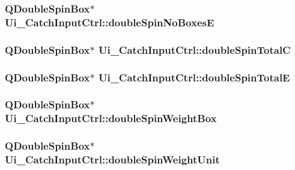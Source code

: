 \hypertarget{class_ui___catch_input_ctrl_aa9fa8f4049a06445c3abbc8291ffe0b3}{
\subsubsection[{doubleSpinNoBoxesE}]{\setlength{\rightskip}{0pt plus 5cm}QDoubleSpinBox$\ast$ {\bf Ui\_\-CatchInputCtrl::doubleSpinNoBoxesE}}}
\label{class_ui___catch_input_ctrl_aa9fa8f4049a06445c3abbc8291ffe0b3}
\hypertarget{class_ui___catch_input_ctrl_aff17e56983eb8a28a43bee32c447cbc9}{
\subsubsection[{doubleSpinTotalC}]{\setlength{\rightskip}{0pt plus 5cm}QDoubleSpinBox$\ast$ {\bf Ui\_\-CatchInputCtrl::doubleSpinTotalC}}}
\label{class_ui___catch_input_ctrl_aff17e56983eb8a28a43bee32c447cbc9}
\hypertarget{class_ui___catch_input_ctrl_a78f71e94d3f0fa1afb22097a90f9c32c}{
\subsubsection[{doubleSpinTotalE}]{\setlength{\rightskip}{0pt plus 5cm}QDoubleSpinBox$\ast$ {\bf Ui\_\-CatchInputCtrl::doubleSpinTotalE}}}
\label{class_ui___catch_input_ctrl_a78f71e94d3f0fa1afb22097a90f9c32c}
\hypertarget{class_ui___catch_input_ctrl_aca5b5c50124d550c442508bf5c871b37}{
\subsubsection[{doubleSpinWeightBox}]{\setlength{\rightskip}{0pt plus 5cm}QDoubleSpinBox$\ast$ {\bf Ui\_\-CatchInputCtrl::doubleSpinWeightBox}}}
\label{class_ui___catch_input_ctrl_aca5b5c50124d550c442508bf5c871b37}
\hypertarget{class_ui___catch_input_ctrl_a3a85d92aac141bde03e7842eb58e3973}{
\subsubsection[{doubleSpinWeightUnit}]{\setlength{\rightskip}{0pt plus 5cm}QDoubleSpinBox$\ast$ {\bf Ui\_\-CatchInputCtrl::doubleSpinWeightUnit}}}
